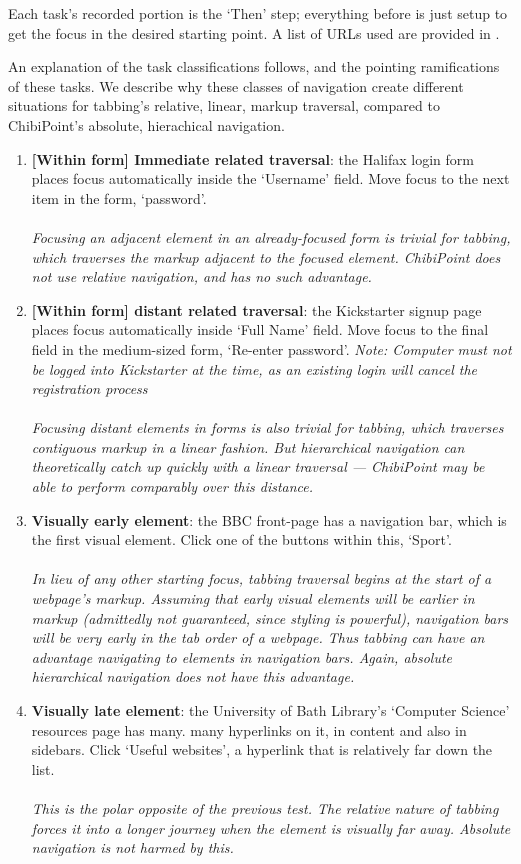 \documentclass[11pt,openright,a4paper]{report}
\begin{document}
Each task's recorded portion is the `Then' step; everything before is just setup to get the focus in the desired starting point. A list of URLs used are provided in .

An explanation of the task classifications follows, and the pointing ramifications of these tasks. We describe why these classes of navigation create different situations for tabbing's relative, linear, markup traversal, compared to ChibiPoint's absolute, hierachical navigation.

\newcommand{\TaskDef}[3]{\item \textbf{#1}: #2\\\\\textit{#3}}

\begin{enumerate}
	\TaskDef{[Within form] Immediate related traversal}{the Halifax login form places focus automatically inside the `Username' field. Move focus to the next item in the form, `password'.}{Focusing an adjacent element in an already-focused form is trivial for tabbing, which traverses the markup adjacent to the focused element. ChibiPoint does not use relative navigation, and has no such advantage.}
	\TaskDef{[Within form] distant related traversal}{the Kickstarter signup page places focus automatically inside `Full Name' field. Move focus to the final field in the medium-sized form, `Re-enter password'. \textit{Note: Computer must not be logged into Kickstarter at the time, as an existing login will cancel the registration process}}{Focusing distant elements in forms is also trivial for tabbing, which traverses contiguous markup in a linear fashion. But hierarchical navigation can theoretically catch up quickly with a linear traversal --- ChibiPoint may be able to perform comparably over this distance.}
	\TaskDef{Visually early element}{the BBC front-page has a navigation bar, which is the first visual element. Click one of the buttons within this, `Sport'.}{In lieu of any other starting focus, tabbing traversal begins at the start of a webpage's markup. Assuming that early visual elements will be earlier in markup (admittedly not guaranteed, since styling is powerful), navigation bars will be very early in the tab order of a webpage. Thus tabbing can have an advantage navigating to elements in navigation bars. Again, absolute hierarchical navigation does not have this advantage.}
	\TaskDef{Visually late element}{the University of Bath Library's `Computer Science' resources page has many. 
	many hyperlinks on it, in content and also in sidebars. Click `Useful websites', a hyperlink that is relatively far down the list.}{This is the polar opposite of the previous test. The relative nature of tabbing forces it into a longer journey when the element is visually far away. Absolute navigation is not harmed by this.}

\end{enumerate}
\end{document}
